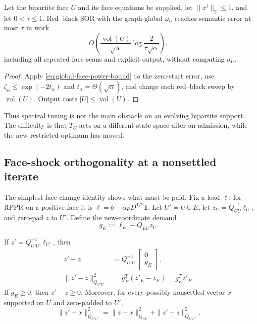 \begin{corollary}
\label{cor:global-omega-fixed-face-work}
Let the bipartite face $U$ and its face equations be supplied, let
$\|x^\dagger\|_2\leq1$, and let $0<\tau\leq1$.  Red--black SOR with the
graph-global $\omega_\alpha$ reaches semantic error at most $\tau$ in work
\begin{equation}
 O\!\left(
  \frac{\operatorname{vol}(U)}{\sqrt\alpha}
  \log\frac{2}{\tau\sqrt\alpha}
 \right),
 \label{eq:global-omega-fixed-face-work}
\end{equation}
including all repeated face scans and explicit output, without computing
$\sigma_U$.
\end{corollary}

\begin{proof}
Apply \eqref{eq:global-face-power-bound} to the zero-start error, use
$\zeta_\alpha\leq\exp(-2t_\alpha)$ and
$t_\alpha=\Theta(\sqrt\alpha)$, and charge each red--black sweep by
$\operatorname{vol}(U)$.  Output costs $|U|\leq\operatorname{vol}(U)$.
\end{proof}

Thus spectral tuning is not the main obstacle on an evolving bipartite
support.  The difficulty is that $T_U$ acts on a different state space after
an admission, while the new restricted optimum has moved.

\subsection{Face-shock orthogonality at a nonsettled iterate}

The simplest face-change identity shows what must be paid.  Fix a load
$\ell$; for RPPR on a positive face it is
$\ell=b-\alpha\rho D^{1/2}\mathbf1$.  Let $U'=U\mathbin{\dot\cup}E$, let
$z_U=Q_{UU}^{-1}\ell_U$, and zero-pad $z$ to $U'$.  Define the new-coordinate
demand
\begin{equation}
 g_E:=\ell_E-Q_{EU}z_U.
 \label{eq:new-face-demand}
\end{equation}

\begin{lemma}
\label{lem:settled-face-shock}
If $z'=Q_{U'U'}^{-1}\ell_{U'}$, then
\begin{align}
 z'-z&=Q_{U'U'}^{-1}
       \begin{bmatrix}0\\g_E\end{bmatrix},
 \label{eq:face-shift-resolvent}\\
 \|z'-z\|_{Q_{U'U'}}^2
 &=g_E^T(z'_E-z_E)=g_E^Tz'_E.
 \label{eq:face-shock-energy}
\end{align}
If $g_E\geq0$, then $z'-z\geq0$.  Moreover, for every possibly
nonsettled vector $x$ supported on $U$ and zero-padded to $U'$,
\begin{equation}
 \boxed{
 \|z'-x\|_{Q_{U'U'}}^2
 =
 \|z-x\|_{Q_{UU}}^2
 +\|z'-z\|_{Q_{U'U'}}^2.}
 \label{eq:nonsettled-face-pythagoras}
\end{equation}
\end{lemma}

